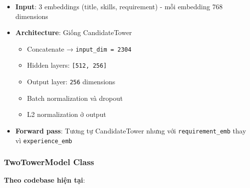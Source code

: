 \begin{itemize}
    \item \textbf{Input}: 3 embeddings (title, skills, requirement) - mỗi embedding 768 dimensions
    \item \textbf{Architecture}: Giống CandidateTower
    \begin{itemize}
        \item Concatenate → \texttt{input\_dim = 2304}
        \item Hidden layers: \texttt{[512, 256]}
        \item Output layer: \texttt{256} dimensions
        \item Batch normalization và dropout
        \item L2 normalization ở output
    \end{itemize}
    \item \textbf{Forward pass}: Tương tự CandidateTower nhưng với \texttt{requirement\_emb} thay vì \texttt{experience\_emb}
\end{itemize}

\subsubsection{TwoTowerModel Class}

\textbf{Theo codebase hiện tại}:


